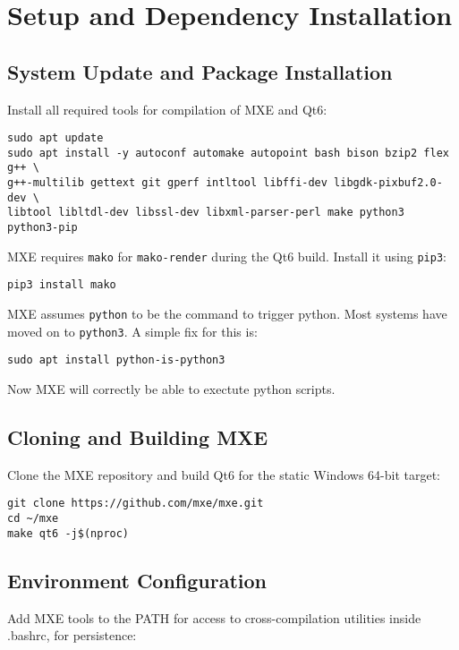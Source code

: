 \documentclass{report}
\begin{document}
\chapter{Setup and Dependency Installation}

\section{System Update and Package Installation}

Install all required tools for compilation of MXE and Qt6:

\begin{verbatim}
sudo apt update
sudo apt install -y autoconf automake autopoint bash bison bzip2 flex g++ \
g++-multilib gettext git gperf intltool libffi-dev libgdk-pixbuf2.0-dev \
libtool libltdl-dev libssl-dev libxml-parser-perl make python3 python3-pip
\end{verbatim}
MXE requires \texttt{mako} for \texttt{mako-render} during the Qt6 build. Install it using \texttt{pip3}:

\begin{verbatim}
pip3 install mako
\end{verbatim}
MXE assumes \texttt{python} to be the command to trigger python. Most systems have moved on to \texttt{python3}. A simple fix for this is:

\begin{verbatim}
sudo apt install python-is-python3
\end{verbatim}
Now MXE will correctly be able to exectute python scripts.

\section{Cloning and Building MXE}

Clone the MXE repository and build Qt6 for the static Windows 64-bit target:

\begin{verbatim}
git clone https://github.com/mxe/mxe.git
cd ~/mxe
make qt6 -j$(nproc)
\end{verbatim}

\section{Environment Configuration}

Add MXE tools to the PATH for access to cross-compilation utilities inside .bashrc, for persistence:
\end{document}
